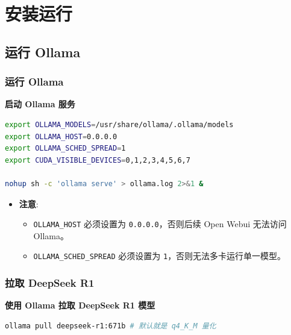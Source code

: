 \section{安装运行}

\subsection{运行 Ollama}

\begin{frame}[fragile]
\frametitle{运行 Ollama}
\textbf{启动 Ollama 服务}
\begin{lstlisting}[language=bash]
export OLLAMA_MODELS=/usr/share/ollama/.ollama/models
export OLLAMA_HOST=0.0.0.0
export OLLAMA_SCHED_SPREAD=1
export CUDA_VISIBLE_DEVICES=0,1,2,3,4,5,6,7

nohup sh -c 'ollama serve' > ollama.log 2>&1 &
\end{lstlisting}
\begin{itemize}
    \item \textbf{注意}:
    \begin{itemize}
        \item \texttt{OLLAMA\_HOST} 必须设置为 \texttt{0.0.0.0}，否则后续 Open Webui 无法访问 Ollama。
        \item \texttt{OLLAMA\_SCHED\_SPREAD} 必须设置为 \texttt{1}，否则无法多卡运行单一模型。
    \end{itemize}
\end{itemize}
\end{frame}

\begin{frame}[fragile]
\frametitle{拉取 DeepSeek R1}
\textbf{使用 Ollama 拉取 DeepSeek R1 模型}
\begin{lstlisting}[language=bash]
ollama pull deepseek-r1:671b # 默认就是 q4_K_M 量化
\end{lstlisting}
\end{frame}

